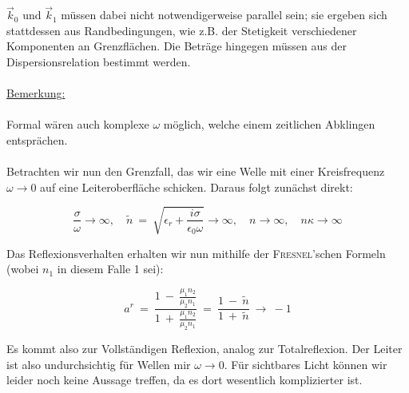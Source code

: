 $\vec{k}_0$ und $\vec{k}_1$ müssen dabei nicht notwendigerweise parallel sein; sie ergeben sich stattdessen aus Randbedingungen, wie z.B. der Stetigkeit verschiedener Komponenten an Grenzflächen. Die Beträge hingegen müssen aus der Dispersionsrelation bestimmt werden.
\ \\
\ \\
\underline{Bemerkung:}\\
\ \\
Formal wären auch komplexe $\omega$ möglich, welche einem zeitlichen Abklingen entsprächen.
\ \\
\ \\
Betrachten wir nun den Grenzfall, das wir eine Welle mit einer Kreisfrequenz $\omega \rightarrow 0$ auf eine Leiteroberfläche schicken. Daraus folgt zunächst direkt:

\begin{equation*}
\frac{\sigma}{\omega} \rightarrow \infty, \quad \tilde{n} \ = \ \sqrt{\epsilon_r + \frac{i\sigma}{\epsilon_0 \omega}}\rightarrow\infty, \quad n\rightarrow\infty,\quad n\kappa\rightarrow\infty
\end{equation*}

Das Reflexionsverhalten erhalten wir nun mithilfe der \textsc{Fresnel}'schen Formeln (wobei $n_1$ in diesem Falle 1 sei):

\begin{equation*}
a^r  \ = \  \frac{1 \ - \ \frac{\mu_1 n_2}{\mu_2 n_1}}{1 \ + \ \frac{\mu_1 n_2}{\mu_2 n_1}} \ = \ \frac{1 \ - \ \tilde{n}}{1\ + \ \tilde{n}} \ \rightarrow\  -1
\end{equation*}

Es kommt also zur Vollständigen Reflexion, analog zur Totalreflexion. Der Leiter ist also undurchsichtig für Wellen mir $\omega \rightarrow 0$. Für sichtbares Licht können wir leider noch keine Aussage treffen, da es dort wesentlich komplizierter ist.

